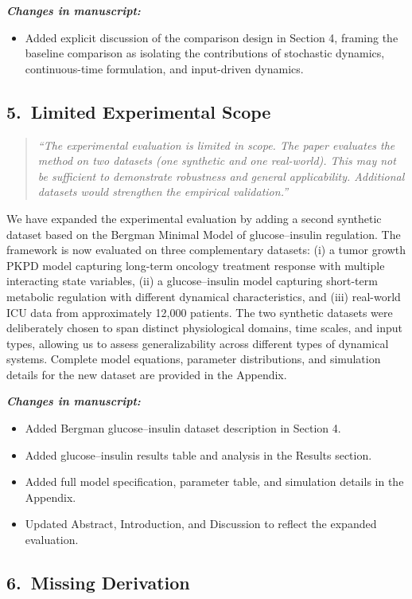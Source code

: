 \documentclass[12pt]{article}
\newcommand{\reviewercomment}[1]{%
  \begin{quote}
  \textcolor{reviewergray}{\textit{``#1''}}
  \end{quote}
}
\newcommand{\changes}{\vspace{0.3em}\noindent\textbf{\textit{Changes in manuscript:}}\vspace{0.2em}}
\begin{document}
\changes
\begin{itemize}[leftmargin=2em]
\item Added explicit discussion of the comparison design in Section 4, framing the baseline comparison as isolating the contributions of stochastic dynamics, continuous-time formulation, and input-driven dynamics.
\end{itemize}

\subsection*{5.\ Limited Experimental Scope}

\reviewercomment{The experimental evaluation is limited in scope. The paper evaluates the method on two datasets (one synthetic and one real-world). This may not be sufficient to demonstrate robustness and general applicability. Additional datasets would strengthen the empirical validation.}

We have expanded the experimental evaluation by adding a second synthetic dataset based on the Bergman Minimal Model of glucose--insulin regulation. The framework is now evaluated on three complementary datasets: (i) a tumor growth PKPD model capturing long-term oncology treatment response with multiple interacting state variables, (ii) a glucose--insulin model capturing short-term metabolic regulation with different dynamical characteristics, and (iii) real-world ICU data from approximately 12,000 patients. The two synthetic datasets were deliberately chosen to span distinct physiological domains, time scales, and input types, allowing us to assess generalizability across different types of dynamical systems. Complete model equations, parameter distributions, and simulation details for the new dataset are provided in the Appendix.

\changes
\begin{itemize}[leftmargin=2em]
\item Added Bergman glucose--insulin dataset description in Section 4.
\item Added glucose--insulin results table and analysis in the Results section.
\item Added full model specification, parameter table, and simulation details in the Appendix.
\item Updated Abstract, Introduction, and Discussion to reflect the expanded evaluation.
\end{itemize}

\subsection*{6.\ Missing Derivation}
\end{document}
